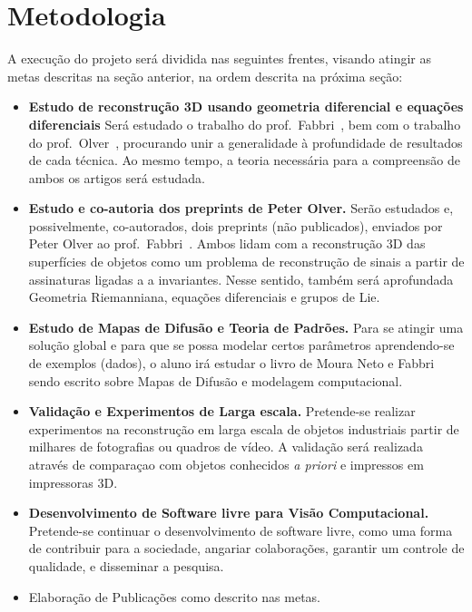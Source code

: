 \documentclass[a4paper,titlepage]{article}
\begin{document}
\section{Metodologia}
A execução do projeto será dividida nas seguintes frentes, visando atingir as
metas descritas na seção anterior, na ordem descrita na próxima seção:
\begin{itemize}
\item \textbf{Estudo de reconstrução 3D usando geometria diferencial e equações
  diferenciais} 
  Será estudado o trabalho do prof.\ Fabbri~\cite{fabbri2016multiview},
  bem com o trabalho do prof.\ Olver~\cite{Kogan:Olver:LobachevskiiJMA2015},
  procurando unir a generalidade à profundidade de resultados de cada técnica.
  Ao mesmo tempo, a teoria necessária para a compreensão de ambos os artigos
  será estudada.
\item \textbf{Estudo e co-autoria dos preprints de Peter Olver.} 
  Serão estudados e, possivelmente, co-autorados, dois preprints (não publicados), enviados por Peter Olver ao
  prof.\ Fabbri~\cite{Olver:Outline:Preprint:2020,Olver:Reprojn:Preprint:2020}. Ambos lidam com a reconstrução 3D das superfícies de objetos
  como um problema de reconstrução de sinais a partir de assinaturas ligadas a
  a invariantes. Nesse sentido, também será aprofundada Geometria Riemanniana,
  equações diferenciais e grupos de Lie.
\item \textbf{Estudo de Mapas de Difusão e Teoria de Padrões.} 
  Para se atingir uma solução global e para que se possa modelar certos
  parâmetros aprendendo-se de exemplos (dados), o aluno irá estudar o livro de
  Moura Neto e Fabbri sendo escrito sobre Mapas de Difusão e modelagem
  computacional.
\item \textbf{Validação e Experimentos de Larga escala.} Pretende-se realizar
experimentos na reconstrução em larga escala de objetos industriais 
partir de milhares de fotografias ou quadros de vídeo. A validação será
realizada através de comparaçao com objetos conhecidos \emph{a priori}
e impressos em impressoras 3D. 
\item \textbf{Desenvolvimento de Software livre para Visão Computacional.}
Pretende-se continuar o desenvolvimento de software livre, como uma
forma de contribuir para a sociedade, angariar colaborações,
garantir um controle de qualidade, e disseminar a pesquisa. 
\item Elaboração de Publicações como descrito nas metas.
\end{itemize}
\end{document}
